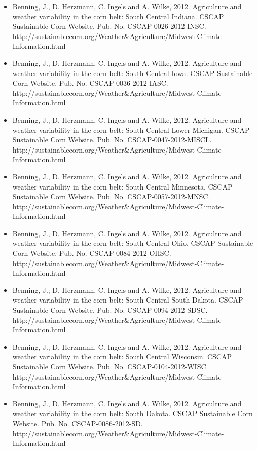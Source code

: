 \begin{itemize}
\item Benning, J., D. Herzmann, C. Ingels and A. Wilke, 2012. Agriculture and weather variability in the corn belt: South Central Indiana. CSCAP Sustainable Corn Website. Pub. No. CSCAP-0026-2012-INSC. http://sustainablecorn.org/Weather\&Agriculture/Midwest-Climate-Information.html

\item Benning, J., D. Herzmann, C. Ingels and A. Wilke, 2012. Agriculture and weather variability in the corn belt: South Central Iowa. CSCAP Sustainable Corn Website. Pub. No. CSCAP-0036-2012-IASC. http://sustainablecorn.org/Weather\&Agriculture/Midwest-Climate-Information.html

\item Benning, J., D. Herzmann, C. Ingels and A. Wilke, 2012. Agriculture and weather variability in the corn belt: South Central Lower Michigan. CSCAP Sustainable Corn Website. Pub. No. CSCAP-0047-2012-MISCL. http://sustainablecorn.org/Weather\&Agriculture/Midwest-Climate-Information.html

\item Benning, J., D. Herzmann, C. Ingels and A. Wilke, 2012. Agriculture and weather variability in the corn belt: South Central Minnesota. CSCAP Sustainable Corn Website. Pub. No. CSCAP-0057-2012-MNSC. http://sustainablecorn.org/Weather\&Agriculture/Midwest-Climate-Information.html

\item Benning, J., D. Herzmann, C. Ingels and A. Wilke, 2012. Agriculture and weather variability in the corn belt: South Central Ohio. CSCAP Sustainable Corn Website. Pub. No. CSCAP-0084-2012-OHSC. http://sustainablecorn.org/Weather\&Agriculture/Midwest-Climate-Information.html

\item Benning, J., D. Herzmann, C. Ingels and A. Wilke, 2012. Agriculture and weather variability in the corn belt: South Central South Dakota. CSCAP Sustainable Corn Website. Pub. No. CSCAP-0094-2012-SDSC. http://sustainablecorn.org/Weather\&Agriculture/Midwest-Climate-Information.html

\item Benning, J., D. Herzmann, C. Ingels and A. Wilke, 2012. Agriculture and weather variability in the corn belt: South Central Wisconsin. CSCAP Sustainable Corn Website. Pub. No. CSCAP-0104-2012-WISC. http://sustainablecorn.org/Weather\&Agriculture/Midwest-Climate-Information.html

\item Benning, J., D. Herzmann, C. Ingels and A. Wilke, 2012. Agriculture and weather variability in the corn belt: South Dakota. CSCAP Sustainable Corn Website. Pub. No. CSCAP-0086-2012-SD. http://sustainablecorn.org/Weather\&Agriculture/Midwest-Climate-Information.html


\end{itemize}
